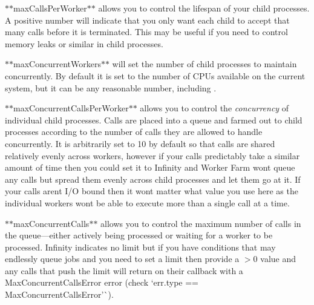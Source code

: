 \begin{DoxyItemize}
\item $\ast$$\ast${\ttfamily max\+Calls\+Per\+Worker}$\ast$$\ast$ allows you to control the lifespan of your child processes. A positive number will indicate that you only want each child to accept that many calls before it is terminated. This may be useful if you need to control memory leaks or similar in child processes.
\item $\ast$$\ast${\ttfamily max\+Concurrent\+Workers}$\ast$$\ast$ will set the number of child processes to maintain concurrently. By default it is set to the number of C\+P\+Us available on the current system, but it can be any reasonable number, including {}.
\item $\ast$$\ast${\ttfamily max\+Concurrent\+Calls\+Per\+Worker}$\ast$$\ast$ allows you to control the {\itshape concurrency} of individual child processes. Calls are placed into a queue and farmed out to child processes according to the number of calls they are allowed to handle concurrently. It is arbitrarily set to 10 by default so that calls are shared relatively evenly across workers, however if your calls predictably take a similar amount of time then you could set it to {\ttfamily Infinity} and Worker Farm won\textquotesingle{}t queue any calls but spread them evenly across child processes and let them go at it. If your calls aren\textquotesingle{}t I/O bound then it won\textquotesingle{}t matter what value you use here as the individual workers won\textquotesingle{}t be able to execute more than a single call at a time.
\item $\ast$$\ast${\ttfamily max\+Concurrent\+Calls}$\ast$$\ast$ allows you to control the maximum number of calls in the queue---either actively being processed or waiting for a worker to be processed. {\ttfamily Infinity} indicates no limit but if you have conditions that may endlessly queue jobs and you need to set a limit then provide a {\ttfamily $>$0} value and any calls that push the limit will return on their callback with a {\ttfamily Max\+Concurrent\+Calls\+Error} error (check `err.\+type == \textquotesingle{}Max\+Concurrent\+Calls\+Error'\`{}).

\end{DoxyItemize}
